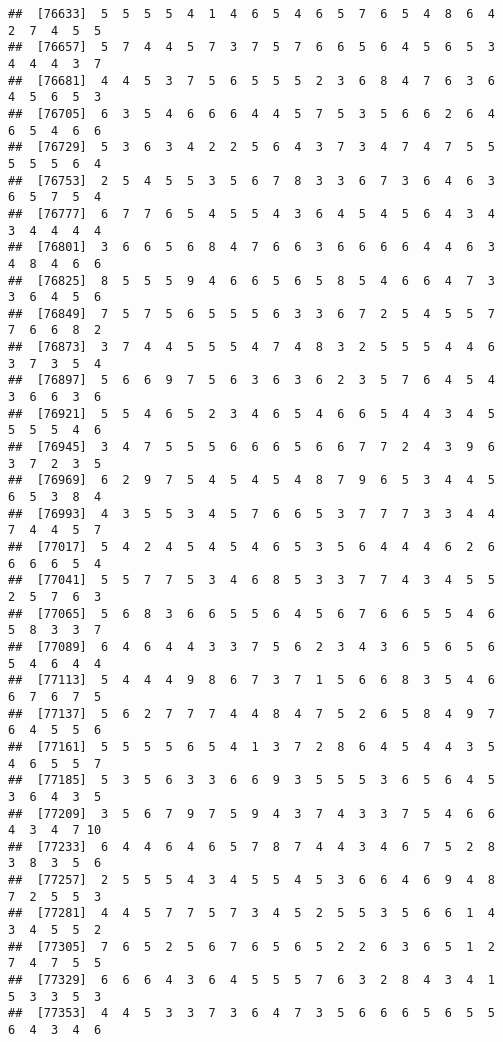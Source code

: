 \documentclass[
]{book}
\begin{document}
\begin{verbatim}
##  [76633]  5  5  5  5  4  1  4  6  5  4  6  5  7  6  5  4  8  6  4  2  7  4  5  5
##  [76657]  5  7  4  4  5  7  3  7  5  7  6  6  5  6  4  5  6  5  3  4  4  4  3  7
##  [76681]  4  4  5  3  7  5  6  5  5  5  2  3  6  8  4  7  6  3  6  4  5  6  5  3
##  [76705]  6  3  5  4  6  6  6  4  4  5  7  5  3  5  6  6  2  6  4  6  5  4  6  6
##  [76729]  5  3  6  3  4  2  2  5  6  4  3  7  3  4  7  4  7  5  5  5  5  5  6  4
##  [76753]  2  5  4  5  5  3  5  6  7  8  3  3  6  7  3  6  4  6  3  6  5  7  5  4
##  [76777]  6  7  7  6  5  4  5  5  4  3  6  4  5  4  5  6  4  3  4  3  4  4  4  4
##  [76801]  3  6  6  5  6  8  4  7  6  6  3  6  6  6  6  4  4  6  3  4  8  4  6  6
##  [76825]  8  5  5  5  9  4  6  6  5  6  5  8  5  4  6  6  4  7  3  3  6  4  5  6
##  [76849]  7  5  7  5  6  5  5  5  6  3  3  6  7  2  5  4  5  5  7  7  6  6  8  2
##  [76873]  3  7  4  4  5  5  5  4  7  4  8  3  2  5  5  5  4  4  6  3  7  3  5  4
##  [76897]  5  6  6  9  7  5  6  3  6  3  6  2  3  5  7  6  4  5  4  3  6  6  3  6
##  [76921]  5  5  4  6  5  2  3  4  6  5  4  6  6  5  4  4  3  4  5  5  5  5  4  6
##  [76945]  3  4  7  5  5  5  6  6  6  5  6  6  7  7  2  4  3  9  6  3  7  2  3  5
##  [76969]  6  2  9  7  5  4  5  4  5  4  8  7  9  6  5  3  4  4  5  6  5  3  8  4
##  [76993]  4  3  5  5  3  4  5  7  6  6  5  3  7  7  7  3  3  4  4  7  4  4  5  7
##  [77017]  5  4  2  4  5  4  5  4  6  5  3  5  6  4  4  4  6  2  6  6  6  6  5  4
##  [77041]  5  5  7  7  5  3  4  6  8  5  3  3  7  7  4  3  4  5  5  2  5  7  6  3
##  [77065]  5  6  8  3  6  6  5  5  6  4  5  6  7  6  6  5  5  4  6  5  8  3  3  7
##  [77089]  6  4  6  4  4  3  3  7  5  6  2  3  4  3  6  5  6  5  6  5  4  6  4  4
##  [77113]  5  4  4  4  9  8  6  7  3  7  1  5  6  6  8  3  5  4  6  6  7  6  7  5
##  [77137]  5  6  2  7  7  7  4  4  8  4  7  5  2  6  5  8  4  9  7  6  4  5  5  6
##  [77161]  5  5  5  5  6  5  4  1  3  7  2  8  6  4  5  4  4  3  5  4  6  5  5  7
##  [77185]  5  3  5  6  3  3  6  6  9  3  5  5  5  3  6  5  6  4  5  3  6  4  3  5
##  [77209]  3  5  6  7  9  7  5  9  4  3  7  4  3  3  7  5  4  6  6  4  3  4  7 10
##  [77233]  6  4  4  6  4  6  5  7  8  7  4  4  3  4  6  7  5  2  8  3  8  3  5  6
##  [77257]  2  5  5  5  4  3  4  5  5  4  5  3  6  6  4  6  9  4  8  7  2  5  5  3
##  [77281]  4  4  5  7  7  5  7  3  4  5  2  5  5  3  5  6  6  1  4  3  4  5  5  2
##  [77305]  7  6  5  2  5  6  7  6  5  6  5  2  2  6  3  6  5  1  2  7  4  7  5  5
##  [77329]  6  6  6  4  3  6  4  5  5  5  7  6  3  2  8  4  3  4  1  5  3  3  5  3
##  [77353]  4  4  5  3  3  7  3  6  4  7  3  5  6  6  6  5  6  5  5  6  4  3  4  6

\end{verbatim}
\end{document}
